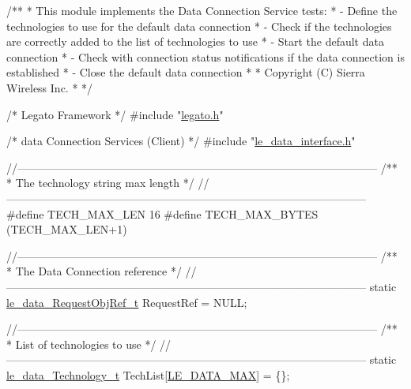 
\begin{DoxyCodeInclude}
\textcolor{comment}{/**}
\textcolor{comment}{ * This module implements the Data Connection Service tests:}
\textcolor{comment}{ * - Define the technologies to use for the default data connection}
\textcolor{comment}{ * - Check if the technologies are correctly added to the list of technologies to use}
\textcolor{comment}{ * - Start the default data connection}
\textcolor{comment}{ * - Check with connection status notifications if the data connection is established}
\textcolor{comment}{ * - Close the default data connection}
\textcolor{comment}{ *}
\textcolor{comment}{ * Copyright (C) Sierra Wireless Inc.}
\textcolor{comment}{ *}
\textcolor{comment}{ */}

\textcolor{comment}{/* Legato Framework */}
\textcolor{preprocessor}{#include "\hyperlink{legato_8h}{legato.h}"}

\textcolor{comment}{/* data Connection Services (Client) */}
\textcolor{preprocessor}{#include "\hyperlink{le__data__interface_8h}{le\_data\_interface.h}"}

\textcolor{comment}{//--------------------------------------------------------------------------------------------------}\textcolor{comment}{}
\textcolor{comment}{/**}
\textcolor{comment}{ * The technology string max length}
\textcolor{comment}{ */}
\textcolor{comment}{//--------------------------------------------------------------------------------------------------}
\textcolor{preprocessor}{#define TECH\_MAX\_LEN        16}
\textcolor{preprocessor}{#define TECH\_MAX\_BYTES      (TECH\_MAX\_LEN+1)}

\textcolor{comment}{//--------------------------------------------------------------------------------------------------}\textcolor{comment}{}
\textcolor{comment}{/**}
\textcolor{comment}{ *  The Data Connection reference}
\textcolor{comment}{ */}
\textcolor{comment}{//--------------------------------------------------------------------------------------------------}
\textcolor{keyword}{static} \hyperlink{le__data__interface_8h_abe5cdfb887a7fe14e991d0a685f9cf2b}{le\_data\_RequestObjRef\_t} RequestRef = NULL;

\textcolor{comment}{//--------------------------------------------------------------------------------------------------}\textcolor{comment}{}
\textcolor{comment}{/**}
\textcolor{comment}{ *  List of technologies to use}
\textcolor{comment}{ */}
\textcolor{comment}{//--------------------------------------------------------------------------------------------------}
\textcolor{keyword}{static} \hyperlink{le__data__interface_8h_a245d12b4d3367d81c0fc8b76fa60674a}{le\_data\_Technology\_t} TechList[\hyperlink{le__data__interface_8h_a245d12b4d3367d81c0fc8b76fa60674aa5143acc7e16842ac4cf33afa34b50c0b}{LE\_DATA\_MAX}] = \{\};


\end{DoxyCodeInclude}
